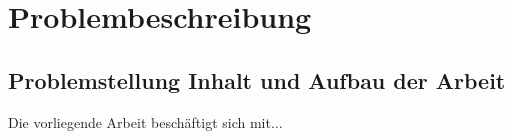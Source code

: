 \chapter{Problembeschreibung}
\label{chap:problemstellung}
\minitoc
\section{Problemstellung Inhalt und Aufbau der Arbeit}
Die vorliegende Arbeit beschäftigt sich mit$\ldots$
